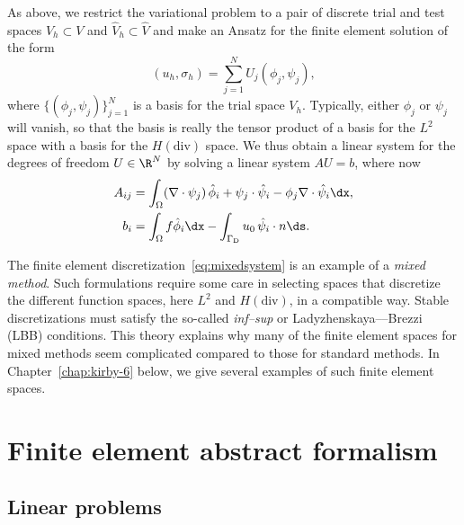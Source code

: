 As above, we restrict the variational problem to a pair of discrete
trial and test spaces $V_h \subset V$ and $\hat{V}_h \subset \hat{V}$
and make an Ansatz for the finite element solution of the form
\begin{equation}
  (u_h, \sigma_h) = \sum_{j=1}^N U_j (\phi_j, \psi_j),
\end{equation}
where $\{(\phi_j, \psi_j)\}_{j=1}^N$ is a basis for the trial space
$V_h$. Typically, either \( \phi_j \) or \( \psi_j \) will vanish, so
that the basis is really the tensor product of a basis for the \( L^2
\) space with a basis for the \( H(\mathrm{div}) \) space. We thus
obtain a linear system for the degrees of freedom $U \in \R^N$ by
solving a linear system $A U = b$, where now
\begin{equation} \label{eq:mixedsystem}
  \begin{split}
    A_{ij} &=
    \int_{\Omega} (\nabla \cdot \psi_j) \, \hat{\phi}_i
    + \psi_j \cdot \hat{\psi}_i
    - \phi_j \nabla \cdot \hat{\psi}_i \dx, \\
    b_i &=
    \int_{\Omega} f \hat{\phi}_i \dx
    - \int_{\Gamma_{\mathrm{D}}} u_0 \, \hat{\psi}_i \cdot n \ds.
  \end{split}
\end{equation}

The finite element discretization~\eqref{eq:mixedsystem} is an example
of a \emph{mixed method}. Such formulations require some care in
selecting spaces that discretize the different function spaces, here
\( L^2 \) and \( H(\mathrm{div}) \), in a compatible way.  Stable
discretizations must satisfy the so-called \emph{inf--sup} or
Ladyzhenskaya--\babuska{}--Brezzi (LBB) conditions. This theory
explains why many of the finite element spaces for mixed methods seem
complicated compared to those for standard methods. In
Chapter~\ref{chap:kirby-6} below, we give several examples of such
finite element spaces.

\section{Finite element abstract formalism}
\label{sec:abstract}

\subsection{Linear problems}
\label{sec:abstract,linear}

